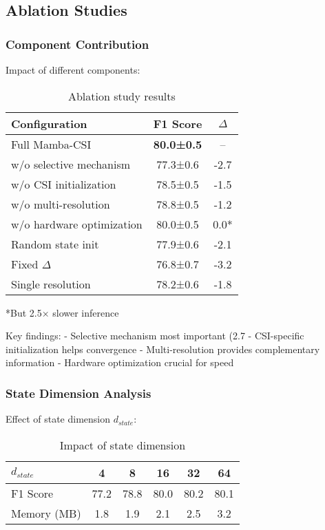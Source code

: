 \documentclass[10pt,journal,compsoc]{IEEEtran}
\begin{document}
\subsection{Ablation Studies}

\subsubsection{Component Contribution}

Impact of different components:

\begin{table}[h]
\centering
\caption{Ablation study results}
\label{tab:ablation}
\begin{tabular}{lcc}
\toprule
Configuration & F1 Score & $\Delta$ \\
\midrule
Full Mamba-CSI & \textbf{80.0±0.5} & -- \\
\midrule
w/o selective mechanism & 77.3±0.6 & -2.7 \\
w/o CSI initialization & 78.5±0.5 & -1.5 \\
w/o multi-resolution & 78.8±0.5 & -1.2 \\
w/o hardware optimization & 80.0±0.5 & 0.0* \\
\midrule
Random state init & 77.9±0.6 & -2.1 \\
Fixed $\Delta$ & 76.8±0.7 & -3.2 \\
Single resolution & 78.2±0.6 & -1.8 \\
\bottomrule
\end{tabular}
*But 2.5× slower inference
\end{table}

Key findings:
- Selective mechanism most important (2.7%
- CSI-specific initialization helps convergence
- Multi-resolution provides complementary information
- Hardware optimization crucial for speed

\subsubsection{State Dimension Analysis}

Effect of state dimension $d_{state}$:

\begin{table}[h]
\centering
\caption{Impact of state dimension}
\label{tab:state_dim}
\begin{tabular}{lccccc}
\toprule
$d_{state}$ & 4 & 8 & 16 & 32 & 64 \\
\midrule
F1 Score & 77.2 & 78.8 & 80.0 & 80.2 & 80.1 \\
Memory (MB) & 1.8 & 1.9 & 2.1 & 2.5 & 3.2 \\
\bottomrule
\end{tabular}
\end{table}
\end{document}
